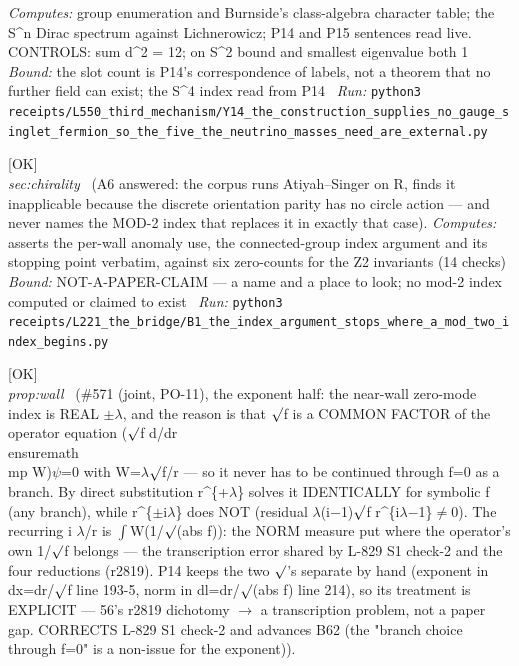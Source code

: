 \begin{description}
\emph{Computes:} group enumeration and Burnside's class-algebra character table; the S\textasciicircum{}n Dirac spectrum against Lichnerowicz; P14 and P15 sentences read live. CONTROLS: sum d\textasciicircum{}2 = 12; on S\textasciicircum{}2 bound and smallest eigenvalue both 1
 \emph{Bound:} the slot count is P14's correspondence of labels, not a theorem that no further field can exist; the S\textasciicircum{}4 index read from P14
\ \emph{Run:} \texttt{python3 receipts/L550\_third\_mechanism/Y14\_the\_construction\_supplies\_no\_gauge\_singlet\_fermion\_so\_the\_five\_the\_neutrino\_masses\_need\_are\_external.py}
\item[\label{rcpt:B1_the_index_argument_stops_where_a_mod_two_index_begins}\textbf{}\quad\texttt{B1\_the\_index\_argument\_stops\_where\_a\_mod\_two\_index\_begins}]\hfill\textsf{[OK]}\\
\textit{sec:chirality} \ (A6 answered: the corpus runs Atiyah--Singer on R, finds it inapplicable because the discrete orientation parity has no circle action --- and never names the MOD-2 index that replaces it in exactly that case). 
\emph{Computes:} asserts the per-wall anomaly use, the connected-group index argument and its stopping point verbatim, against six zero-counts for the Z2 invariants (14 checks)
 \emph{Bound:} NOT-A-PAPER-CLAIM --- a name and a place to look; no mod-2 index computed or claimed to exist
\ \emph{Run:} \texttt{python3 receipts/L221\_the\_bridge/B1\_the\_index\_argument\_stops\_where\_a\_mod\_two\_index\_begins.py}
\item[\label{rcpt:S3_the_wall_index_is_real_because_sqrt_f_factors_out_of_the_operator_not_the_norm}\textbf{}\quad\texttt{S3\_the\_wall\_index\_is\_real\_because\_sqrt\_f\_factors\_out\_of\_the\_operator\_not\_the\_norm}]\hfill\textsf{[OK]}\\
\textit{prop:wall} \ (\#571 (joint, PO-11), the exponent half: the near-wall zero-mode index is REAL \ensuremath{\pm}\ensuremath{\lambda}, and the reason is that \ensuremath{\surd}f is a COMMON FACTOR of the operator equation (\ensuremath{\surd}f d/dr \\ensuremath{\\mp} W)\ensuremath{\psi}=0 with W=\ensuremath{\lambda}\ensuremath{\surd}f/r --- so it never has to be continued through f=0 as a branch. By direct substitution r\textasciicircum{}\{+\ensuremath{\lambda}\} solves it IDENTICALLY for symbolic f (any branch), while r\textasciicircum{}\{\ensuremath{\pm}i\ensuremath{\lambda}\} does NOT (residual \ensuremath{\lambda}(i\ensuremath{-}1)\ensuremath{\surd}f r\textasciicircum{}\{i\ensuremath{\lambda}\ensuremath{-}1\}\ensuremath{\ne}0). The recurring i \ensuremath{\lambda}/r is \ensuremath{\int}W(1/\ensuremath{\surd}(abs f)): the NORM measure put where the operator's own 1/\ensuremath{\surd}f belongs --- the transcription error shared by L-829 S1 check-2 and the four reductions (r2819). P14 keeps the two \ensuremath{\surd}'s separate by hand (exponent in dx=dr/\ensuremath{\surd}f line 193-5, norm in dl=dr/\ensuremath{\surd}(abs f) line 214), so its treatment is EXPLICIT --- 56's r2819 dichotomy \ensuremath{\to} a transcription problem, not a paper gap. CORRECTS L-829 S1 check-2 and advances B62 (the "branch choice through f=0" is a non-issue for the exponent)). 

\end{description}
